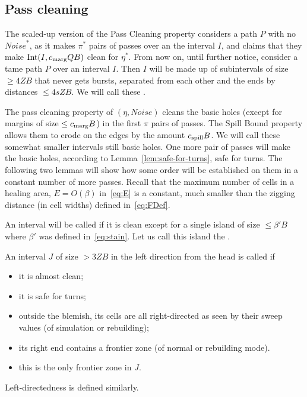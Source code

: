 \documentclass[11pt]{memoir}
\theoremstyle{definition} %
\renewcommand{\le}{\leq}
\renewcommand{\ge}{\geq}
\def\B{B}
\newcommand{\E}{E} %
\newcommand{\Int}{\mathrm{Int}} %
\newcommand{\Noise}{\mathit{Noise}}
\newcommand{\passno}{\pi}
\newcommand{\Q}{Q} %
\newcommand{\s}{s} %
\newcommand{\Z}{Z} %
\newcommand{\cns}[1]{c_{\textrm{\upshape #1}}}
\newcommand{\CMarg}{\cns{marg}}
\newcommand{\CSpill}{\cns{spill}}
\begin{document}
\subsection{Pass cleaning}\label{sec:pass-cleaning}

The scaled-up version of the Pass Cleaning property
considers a path \( P \) with no \( \Noise^{*} \), as it makes
\( \passno^{*} \) pairs of passes over an the interval \( I \),
 and claims that they make \( \Int(I,\CMarg\Q\B) \) clean for \( \eta^{*} \).
 From now on, until further notice, consider a tame path \( P \) over an interval \( I \).
 Then \( I \) will be made up of subintervals of
 size \( \ge 4\Z\B \) that never gets bursts,
 separated from each other and the ends by distances \( \le 4\s\Z\B \).
 We will call these .
 
The pass cleaning property of \( (\eta,\Noise) \) cleans the basic
holes (except for margins of size \( \le\CMarg\B \)) in the first \( \passno \) pairs of passes.
The Spill Bound property allows them to erode on the edges by the amount \( \CSpill\B \).
We will call these somewhat smaller intervals still basic holes.
One more pair of passes
will make the basic holes, according to Lemma~\ref{lem:safe-for-turns}, safe for turns.
The following two lemmas will show how some order will be established on them in a constant
number of more passes.
Recall that the maximum number of cells in a healing area, \( \E  = O(\beta) \) in~\eqref{eq:E}
is a constant, much smaller than the zigging distance (in cell widths) defined in~\eqref{eq:FDef}.

\begin{definition}\label{def:directed}
  An interval will be called  if
  it is clean except for a single island of size \( \le \beta'\B \) where \( \beta' \) was
  defined in~\eqref{eq:stain}.
  Let us call this island the .

  An interval \( J \) of size \( >3\Z\B \) in the left direction from the head is
  called  if
  \begin{itemize}
  \item it is almost clean;
  \item it is safe for turns;
  \item outside the blemish, its cells are all right-directed as seen by their sweep values (of
    simulation or rebuilding);
  \item its right end contains a frontier zone (of normal or rebuilding mode).
  \item this is the only frontier zone in \( J \).
  \end{itemize}
  Left-directedness is defined similarly.
\end{definition}
\end{document}
